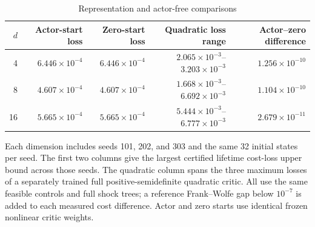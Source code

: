 \begin{table}[t]
\centering
\caption{Representation and actor-free comparisons}
\label{tab:r5_resource}
\small
\begin{tabular}{rrrrr}
\toprule
$d$ & Actor-start loss & Zero-start loss & Quadratic loss range & Actor--zero difference \\
\midrule
4 & $6.446\times10^{-4}$ & $6.446\times10^{-4}$ & $2.065\times10^{-3}$--$3.203\times10^{-3}$ & $1.256\times10^{-10}$ \\
8 & $4.607\times10^{-4}$ & $4.607\times10^{-4}$ & $1.668\times10^{-3}$--$6.692\times10^{-3}$ & $1.104\times10^{-10}$ \\
16 & $5.665\times10^{-4}$ & $5.665\times10^{-4}$ & $5.444\times10^{-3}$--$6.777\times10^{-3}$ & $2.679\times10^{-11}$ \\
\bottomrule
\end{tabular}
\par\medskip
\begin{minipage}{.97\linewidth}
\footnotesize Each dimension includes seeds 101, 202, and 303 and the same 32 initial states per seed. The first two columns give the largest certified lifetime cost-loss upper bound across those seeds. The quadratic column spans the three maximum losses of a separately trained full positive-semidefinite quadratic critic. All use the same feasible controls and full shock trees; a reference Frank--Wolfe gap below $10^{-7}$ is added to each measured cost difference. Actor and zero starts use identical frozen nonlinear critic weights.
\end{minipage}
\end{table}

